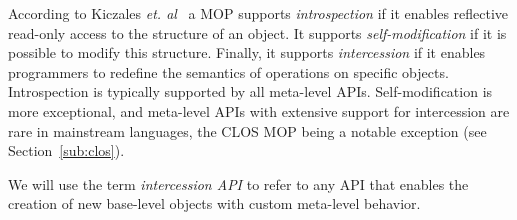 \documentclass{sig-alternate}
\begin{document}
According to Kiczales \emph{et. al}~\cite{kiczales91art} a MOP supports \emph{introspection} if it enables reflective read-only access to the structure of an object. It supports \emph{self-modification} if it is possible to modify this structure.
Finally, it supports \emph{intercession} if it enables programmers to redefine the semantics of operations on specific objects.
Introspection is typically supported by all meta-level APIs. Self-modification is more exceptional, and
meta-level APIs with extensive support for intercession are rare in mainstream languages, the CLOS MOP being a notable exception (see Section~\ref{sub:clos}).

We will use the term \emph{intercession API} to refer to any API that enables the creation of new base-level objects with custom meta-level behavior.



\end{document}
